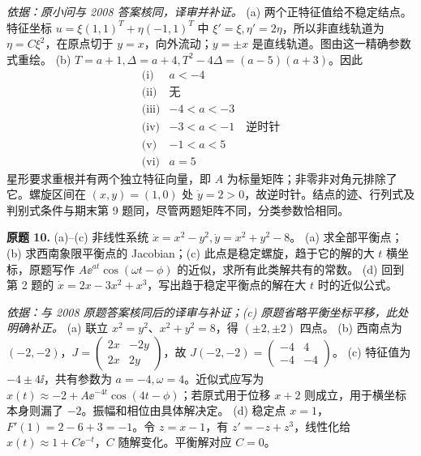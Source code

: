 \begin{solution}
\textit{依据：原小问与 2008 答案核同，译审并补证。}
(a) 两个正特征值给不稳定结点。特征坐标 $u=\xi(1,1)^T+\eta(-1,1)^T$ 中 $\xi'=\xi,\eta'=2\eta$，所以非直线轨道为 $\eta=C\xi^2$，在原点切于 $y=x$，向外流动；$y=\pm x$ 是直线轨道。图由这一精确参数式重绘。\ODEExamNodePortrait
(b) $T=a+1,\Delta=a+4,T^2-4\Delta=(a-5)(a+3)$。因此
\[
\begin{array}{c|l}
\text{(i)}&a<-4\\
\text{(ii)}&\text{无}\\
\text{(iii)}&-4<a<-3\\
\text{(iv)}&-3<a<-1\quad\text{逆时针}\\
\text{(v)}&-1<a<5\\
\text{(vi)}&a=5
\end{array}
\]
星形要求重根并有两个独立特征向量，即 $A$ 为标量矩阵；非零非对角元排除了它。螺旋区间在 $(x,y)=(1,0)$ 处 $\dot y=2>0$，故逆时针。结点的迹、行列式及判别式条件与期末第 9 题同，尽管两题矩阵不同，分类参数恰相同。
\end{solution}
\begin{exercise}\label{cw:prfinal-10}\textbf{原题 10.}
(a)--(c) 非线性系统 $\dot x=x^2-y^2,\dot y=x^2+y^2-8$。
(a) 求全部平衡点；(b) 求西南象限平衡点的 Jacobian；(c) 此点是稳定螺旋，趋于它的解的大 $t$ 横坐标，原题写作 $A\ee^{at}\cos(\omega t-\phi)$ 的近似，求所有此类解共有的常数。
(d) 回到第 2 题的 $\dot x=2x-3x^2+x^3$，写出趋于稳定平衡点的解在大 $t$ 时的近似公式。
\end{exercise}
\begin{solution}
\textit{依据：与 2008 原题答案核同后的译审与补证；(c) 原题省略平衡坐标平移，此处明确补正。}
(a) 联立 $x^2=y^2$、$x^2+y^2=8$，得 $(\pm2,\pm2)$ 四点。
(b) 西南点为 $(-2,-2)$，$J=\begin{pmatrix}2x&-2y\\2x&2y\end{pmatrix}$，故 $J(-2,-2)=\begin{pmatrix}-4&4\\-4&-4\end{pmatrix}$。
(c) 特征值为 $-4\pm4\ii$，共有参数为 $a=-4,\omega=4$。近似式应写为 $x(t)\approx-2+A\ee^{-4t}\cos(4t-\phi)$；若原式用于位移 $x+2$ 则成立，用于横坐标本身则漏了 $-2$。振幅和相位由具体解决定。
(d) 稳定点 $x=1$，$F'(1)=2-6+3=-1$。令 $z=x-1$，有 $z'=-z+z^3$，线性化给 $x(t)\approx1+C\ee^{-t}$，$C$ 随解变化。平衡解对应 $C=0$。
\end{solution}

